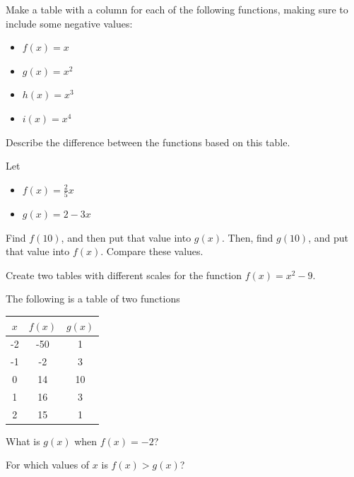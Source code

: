 \begin{exercise}
Make a table with a column for each of the following functions, making sure to include some negative values:

\begin{itemize}
\item $f(x) = x$
\item $g(x) = x^2$
\item $h(x) = x^3$
\item $i(x) = x^4$
\end{itemize}

Describe the difference between the functions based on this table.

\end{exercise}
\bigskip

\begin{exercise}

Let 
\begin{itemize}
\item $f(x) = \frac{2}{5}x$
\item $g(x) = 2 - 3x$
\end{itemize}

Find $f(10)$, and then put that value into $g(x)$.  Then, find $g(10)$, and put that value into $f(x)$.  Compare these values.

\end{exercise}

\begin{exercise}
	Create two tables with different scales for the function $f(x) = x^2 - 9$.
\end{exercise}
\bigskip

\begin{exercise}
The following is a table of two functions

\begin{tabular}{|c|c|c|}
\hline
$x$ & $f(x)$ & $g(x)$ \\
\hline
-2 & -50 & 1\\
\hline
-1 & -2 & 3\\
\hline
0 & 14 & 10\\
\hline
1 & 16 & 3\\
\hline
2 & 15 & 1\\
\hline
\end{tabular}

What is $g(x)$ when $f(x) = -2$?

For which values of $x$ is $f(x) > g(x)$?

\end{exercise}
\bigskip

